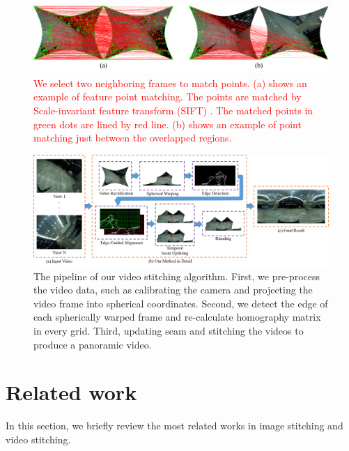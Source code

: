 \documentclass[conference]{IEEEtran}
\begin{document}
\begin{figure}[!htbp]
\centering
\includegraphics[scale=0.3]{picture60.png}
\caption{\textcolor{red}{We select two neighboring frames to match points. (a) shows an example of feature point matching. The points are matched by Scale-invariant feature transform (SIFT) \cite{lowe1999object}. 
The matched points in green dots are lined by red line. (b) shows an example of point matching just between the overlapped regions. }}
\label{fig:failSIFT}
\end{figure}

\begin{figure}
\centering
\includegraphics[scale=0.54]{picture52.png}
\caption{The pipeline of our video stitching algorithm. First, we pre-process the video data, such as calibrating the camera
and projecting the video frame into spherical coordinates. Second, we detect the edge of each spherically
warped frame and re-calculate
homography matrix in every grid. Third, updating seam and stitching the videos to produce a panoramic video.}
\label{fig:res}
\end{figure}

\section{Related work}
\label{sec:related}

In this section, we briefly review the most related works in image stitching and video stitching.
\end{document}

